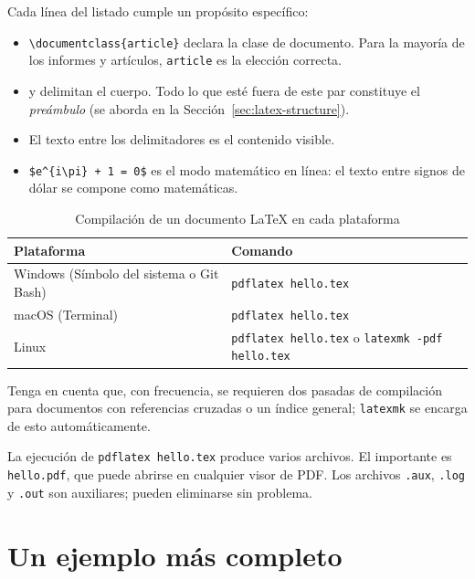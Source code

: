 Cada línea del listado cumple un propósito específico:

\begin{itemize}
    \item \verb|\documentclass{article}| declara la clase de
          documento. Para la mayoría de los informes y artículos,
          \texttt{article} es la elección correcta.
    \item \verb|| y \verb|| delimitan el
          cuerpo. Todo lo que esté fuera de este par constituye el
          \emph{preámbulo} (se aborda en la
          Sección~\ref{sec:latex-structure}).
    \item El texto entre los delimitadores es el contenido visible.
    \item \verb|$e^{i\pi} + 1 = 0$| es el modo matemático en línea: el
          texto entre signos de dólar se compone como matemáticas.
\end{itemize}

\begin{table}[htbp]
\centering
\caption{Compilación de un documento \LaTeX{} en cada plataforma}
\label{tab:latex-compile}
\footnotesize
\begin{tabular}{ll}
\toprule
\textbf{Plataforma} & \textbf{Comando} \\
\midrule
Windows (Símbolo del sistema o Git Bash) & \texttt{pdflatex hello.tex} \\
macOS (Terminal) & \texttt{pdflatex hello.tex} \\
Linux & \texttt{pdflatex hello.tex} o \texttt{latexmk -pdf hello.tex} \\
\bottomrule
\end{tabular}
\end{table}

Tenga en cuenta que, con frecuencia, se requieren dos pasadas de
compilación para documentos con referencias cruzadas o un índice
general; \texttt{latexmk} se encarga de esto automáticamente.

\vs
\noindent
La ejecución de \texttt{pdflatex hello.tex} produce varios archivos.
El importante es \texttt{hello.pdf}, que puede abrirse en cualquier
visor de PDF. Los archivos \texttt{.aux}, \texttt{.log} y
\texttt{.out} son auxiliares; pueden eliminarse sin problema.

\section{Un ejemplo más completo}
\label{sec:latex-example2}


